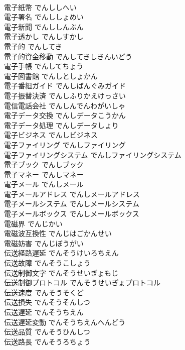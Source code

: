\documentclass[8pt]{extreport}
\begin{document}
\begin{CJK}{UTF8}{min}
\\	電子紙幣	でんししへい	
\\	電子署名	でんししょめい	
\\	電子新聞	でんししんぶん	
\\	電子透かし	でんしすかし	
\\	電子的	でんしてき	
\\	電子的資金移動	でんしてきしきんいどう	
\\	電子手帳	でんしてちょう	
\\	電子図書館	でんしとしょかん	
\\	電子番組ガイド	でんしばんぐみガイド	
\\	電子振替決済	でんしふりかえけっさい	
\\	電信電話会社	でんしんでんわがいしゃ	
\\	電子データ交換	でんしデータこうかん	
\\	電子データ処理	でんしデータしょり	
\\	電子ビジネス	でんしビジネス	
\\	電子ファイリング	でんしファイリング	
\\	電子ファイリングシステム	でんしファイリングシステム	
\\	電子ブック	でんしブック	
\\	電子マネー	でんしマネー	
\\	電子メール	でんしメール	
\\	電子メールアドレス	でんしメールアドレス	
\\	電子メールシステム	でんしメールシステム	
\\	電子メールボックス	でんしメールボックス	
\\	電磁界	でんじかい	
\\	電磁波互換性	でんじはごかんせい	
\\	電磁妨害	でんじぼうがい	
\\	伝送経路遅延	でんそうけいろちえん	
\\	伝送故障	でんそうこしょう	
\\	伝送制御文字	でんそうせいぎょもじ	
\\	伝送制御プロトコル	でんそうせいぎょプロトコル	
\\	伝送速度	でんそうそくど	
\\	伝送損失	でんそうそんしつ	
\\	伝送遅延	でんそうちえん	
\\	伝送遅延変動	でんそうちえんへんどう	
\\	伝送品質	でんそうひんしつ	
\\	伝送路長	でんそうろちょう	

\end{CJK}
\end{document}
